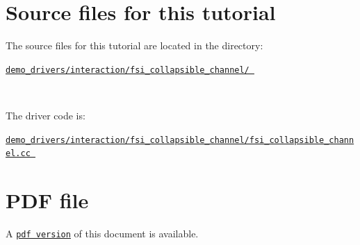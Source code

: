  

\hypertarget{index_sources}{}\section{Source files for this tutorial}\label{index_sources}

\begin{DoxyItemize}
\item The source files for this tutorial are located in the directory\+:~\newline
~\newline
\begin{center} \href{../../../../demo_drivers/interaction/fsi_collapsible_channel/}{\tt demo\+\_\+drivers/interaction/fsi\+\_\+collapsible\+\_\+channel/ } \end{center} ~\newline

\item The driver code is\+: ~\newline
~\newline
\begin{center} \href{../../../../demo_drivers/interaction/fsi_collapsible_channel/fsi_collapsible_channel.cc}{\tt demo\+\_\+drivers/interaction/fsi\+\_\+collapsible\+\_\+channel/fsi\+\_\+collapsible\+\_\+channel.\+cc } \end{center} 
\end{DoxyItemize}

 

 \hypertarget{index_pdf}{}\section{P\+D\+F file}\label{index_pdf}
A \href{../latex/refman.pdf}{\tt pdf version} of this document is available. 
